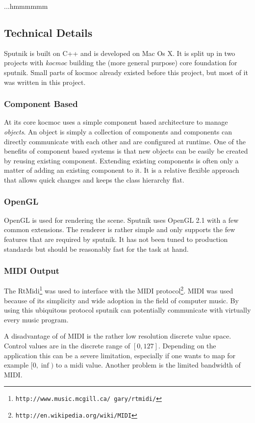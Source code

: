 \documentclass[10pt,a4paper]{scrartcl}
\begin{document}
...hmmmmmm


\subsection{Technical Details}
Sputnik is built on C++ and is developed on Mac Os X. It is split up in two projects with \emph{kocmoc} building the (more general purpose) core foundation for sputnik. Small parts of kocmoc already existed before this project, but most of it was written in this project.

\subsubsection{Component Based}
At its core kocmoc uses a simple component based architecture to manage \emph{objects}. An object is simply a collection of components and components can directly communicate with each other and are configured at runtime. One of the benefits of component based systems is that new objects can be easily be created by reusing existing component. Extending existing components is often only a matter of adding an existing component to it. It is a relative flexible approach that allows quick changes and keeps the class hierarchy flat.

\subsubsection{OpenGL}
OpenGL is used for rendering the scene. Sputnik uses OpenGL 2.1 with a few common extensions. The renderer is rather simple and only supports the few features that are required by sputnik. It has not been tuned to production standards but should be reasonably fast for the task at hand.

\subsubsection{MIDI Output}
The RtMidi\footnote{\texttt{http://www.music.mcgill.ca/~gary/rtmidi/}} was used to interface with the MIDI protocol\footnote{\texttt{http://en.wikipedia.org/wiki/MIDI}}. MIDI was used because of its simplicity and wide adoption in the field of computer music. By using this ubiquitous protocol sputnik can potentially communicate with virtually every music program. 

A disadvantage of of MIDI is the rather low resolution discrete value space. Control values are in the discrete range of $[0, 127]$. Depending on the application this can be a severe limitation, especially if one wants to map for example $[0, \inf)$ to a midi value. Another problem is the limited bandwidth of MIDI.
\end{document}
